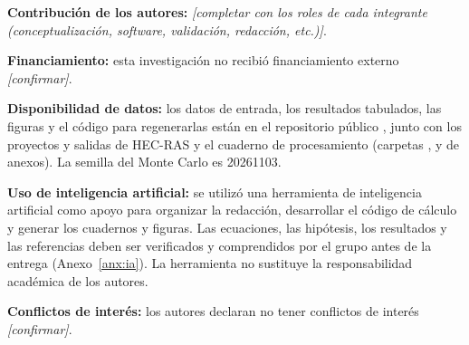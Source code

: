 \vspace{8pt}
\noindent\textbf{Contribución de los autores:} \textit{[completar con los roles de cada integrante (conceptualización, software, validación, redacción, etc.)]}.

\noindent\textbf{Financiamiento:} esta investigación no recibió financiamiento externo \textit{[confirmar]}.

\noindent\textbf{Disponibilidad de datos:} los datos de entrada, los resultados tabulados, las figuras y el código para regenerarlas están en el repositorio público \repo{}, junto con los proyectos y salidas de HEC-RAS y el cuaderno de procesamiento (carpetas ,  y de anexos). La semilla del Monte Carlo es 20261103.

\noindent\textbf{Uso de inteligencia artificial:} se utilizó una herramienta de inteligencia artificial como apoyo para organizar la redacción, desarrollar el código de cálculo y generar los cuadernos y figuras. Las ecuaciones, las hipótesis, los resultados y las referencias deben ser verificados y comprendidos por el grupo antes de la entrega (Anexo~\ref{anx:ia}). La herramienta no sustituye la responsabilidad académica de los autores.

\noindent\textbf{Conflictos de interés:} los autores declaran no tener conflictos de interés \textit{[confirmar]}.
